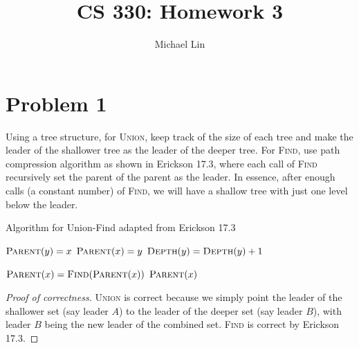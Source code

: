 \documentclass{article}
\title{CS 330: Homework 3}
\author{Michael Lin}
\begin{document}
\maketitle

\section*{Problem 1}
Using a tree structure, for \textsc{Union}, keep track of the size of each tree and make the leader of the shallower tree as the leader of the deeper tree. For \textsc{Find}, use path compression algorithm as shown in Erickson 17.3, where each call of \textsc{Find} recursively set the parent of the parent as the leader. In essence, after enough calls (a constant number) of \textsc{Find}, we will have a shallow tree with just one level below the leader.

\begin{algorithm}
\caption{Algorithm for Union-Find adapted from Erickson 17.3}
\begin{algorithmic}[1]
	\State $\textsc{Parent}(y)=x$
	\Else
		\State $\textsc{Parent}(x) = y$
			\State $\textsc{Depth}(y) = \textsc{Depth}(y)+1$
		
		\EndIf
\EndIf

\EndFunction

	\State $\textsc{Parent}(x) = \textsc{Find}(\textsc{Parent}(x))$
\EndIf
\State \Return $\textsc{Parent}(x)$
\EndFunction

\end{algorithmic}
\end{algorithm}


\begin{proof}[Proof of correctness]
\textsc{Union} is correct because we simply point the leader of the shallower set (say leader $A$) to the leader of the deeper set (say leader $B$), with leader $B$ being the new leader of the combined set. \textsc{Find} is correct by Erickson 17.3. 
\end{proof}
\end{document}
